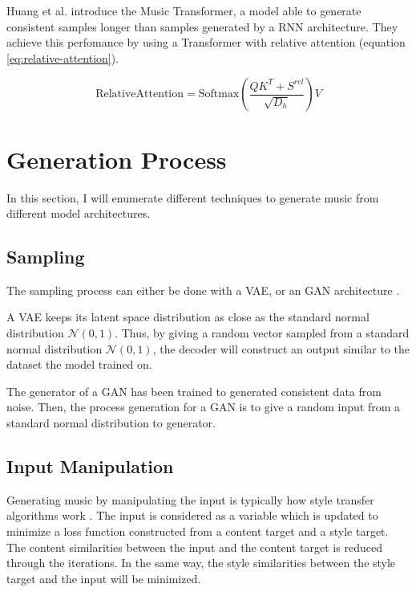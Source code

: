 \documentclass[12pt]{report}
\begin{document}
Huang et al. introduce the Music Transformer, a model able to generate consistent samples longer than samples generated by a RNN architecture.
They achieve this perfomance by using a Transformer with relative attention (equation \ref{eq:relative-attention}).

\begin{equation}
    \text{RelativeAttention} = \text{Softmax} (\frac{QK^T + S^{rel}}{\sqrt{D_h}})V
    \label{eq:relative-attention}
\end{equation}

\section{Generation Process}

In this section, I will enumerate different techniques to generate music from different model architectures.

\subsection{Sampling}

The sampling process can either be done with a VAE, or an GAN architecture \cite{donahue_adversarial_2019}.

A VAE keeps its latent space distribution as close as the standard normal distribution $\mathcal{N}(0, 1)$.
Thus, by giving a random vector sampled from a standard normal distribution $\mathcal{N}(0, 1)$, the decoder will construct an output similar to the dataset the model trained on.

The generator of a GAN has been trained to generated consistent data from noise.
Then, the process generation for a GAN is to give a random input from a standard normal distribution to generator.

\subsection{Input Manipulation}

Generating music by manipulating the input is typically how style transfer algorithms work \cite{shetty_neural_2019, gatys_neural_2015, li_universal_2017}.
The input is considered as a variable which is updated to minimize a loss function constructed from a content target and a style target.
The content similarities between the input and the content target is reduced through the iterations.
In the same way, the style similarities between the style target and the input will be minimized.
\end{document}
